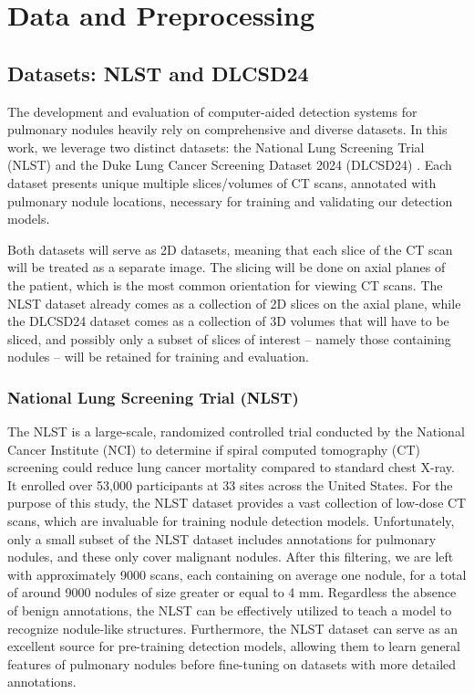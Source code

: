 \chapter{Data and Preprocessing}
\label{chap:data-and-preprocessing}
\section{Datasets: NLST and DLCSD24}
The development and evaluation of computer-aided detection systems for pulmonary nodules heavily rely on comprehensive and diverse datasets. In this work, we leverage two distinct datasets: the National Lung Screening Trial (NLST) \cite{nlst_data} and the Duke Lung Cancer Screening Dataset 2024 (DLCSD24) \cite{dlcsd24}. Each dataset presents unique multiple slices/volumes of CT scans, annotated with pulmonary nodule locations, necessary for training and validating our detection models.

Both datasets will serve as 2D datasets, meaning that each slice of the CT scan will be treated as a separate image. The slicing will be done on axial planes of the patient, which is the most common orientation for viewing CT scans.
The NLST dataset already comes as a collection of 2D slices on the axial plane, while the DLCSD24 dataset comes as a collection of 3D volumes that will have to be sliced, and possibly only a subset of slices of interest -- namely those containing nodules -- will be retained for training and evaluation.

\subsection{National Lung Screening Trial (NLST)}
The NLST is a large-scale, randomized controlled trial conducted by the National Cancer Institute (NCI) to determine if spiral computed tomography (CT) screening could reduce lung cancer mortality compared to standard chest X-ray. It enrolled over 53,000 participants at 33 sites across the United States. For the purpose of this study, the NLST dataset provides a vast collection of low-dose CT scans, which are invaluable for training nodule detection models.
Unfortunately, only a small subset of the NLST dataset includes annotations for pulmonary nodules, and these only cover malignant nodules.
After this filtering, we are left with approximately 9000 scans, each containing on average one nodule, for a total of around 9000 nodules of size greater or equal to 4 mm.
Regardless the absence of benign annotations, the NLST can be effectively utilized to teach a model to recognize nodule-like structures. Furthermore, the NLST dataset can serve as an excellent source for pre-training detection models, allowing them to learn general features of pulmonary nodules before fine-tuning on datasets with more detailed annotations.



